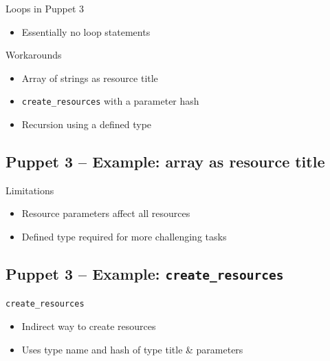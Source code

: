 \documentclass[english,aspectratio=43,nohandout]{beamer}
\begin{document}
\begin{frame}{\insertsection}{\insertsubsection}

Loops in Puppet 3
\begin{itemize}
\item Essentially no loop statements
\end{itemize}

\vspace{\baselineskip}\pause

Workarounds
\begin{itemize}
\item Array of strings as resource title
\item \texttt{create\_resources} with a parameter hash
\item Recursion using a defined type
\end{itemize}
\end{frame}

\subsection{Puppet 3 -- Example: array as resource title}

\begin{frame}{\insertsection}{\insertsubsection}


\vspace{\baselineskip}\pause

Limitations
\begin{itemize}
\item Resource parameters affect all resources
\item Defined type required for more challenging tasks
\end{itemize}
\end{frame}

\subsection{Puppet 3 -- Example: \texttt{create\_resources}}

\begin{frame}{\insertsection}{\insertsubsection}

\texttt{create\_resources}
\begin{itemize}
\item Indirect way to create resources
\item Uses type name and hash of type title \& parameters
\end{itemize}

\vspace{\baselineskip}\pause

\pause

\end{frame}
\end{document}
